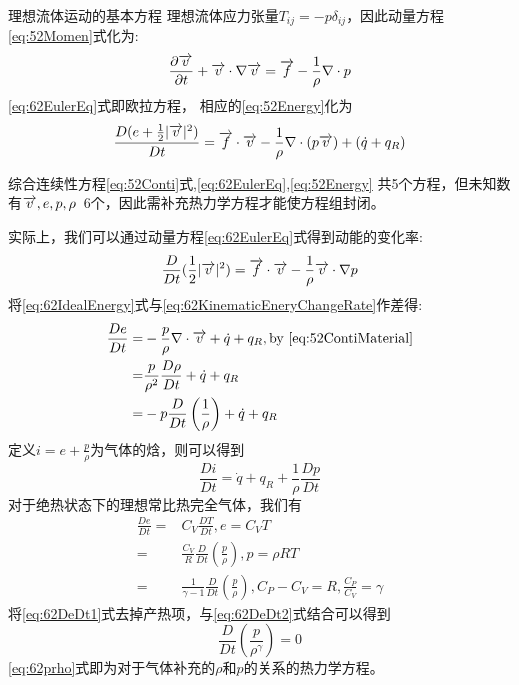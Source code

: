 
理想流体运动的基本方程
理想流体应力张量$T_{ij}=-p\delta_{ij}$，因此动量方程\eqref{eq:52Momen}式化为:
\begin{equation}\label{eq:62EulerEq}
 \frac{\partial \overrightarrow{v}}{\partial t}+\overrightarrow{v}\cdot\nabla\overrightarrow{v}=\overrightarrow{f}-\frac{1}{\rho}\nabla\cdot p
\end{equation}
\eqref{eq:62EulerEq}式即欧拉方程，
相应的\eqref{eq:52Energy}化为
\begin{equation}\label{eq:62IdealEnergy}
 \frac{D(e+\frac{1}{2}|\overrightarrow{v}|^2)}{Dt}=
 \overrightarrow{f}\cdot\overrightarrow{v}-\frac{1}{\rho}\nabla\cdot(p\overrightarrow{v})+(\dot{q}+q_R) 
\end{equation}

综合连续性方程\eqref{eq:52Conti}式,\eqref{eq:62EulerEq},\eqref{eq:52Energy}
共5个方程，但未知数有$\overrightarrow{v},e,p,\rho\,$ 6个，因此需补充热力学方程才能使方程组封闭。

实际上，我们可以通过动量方程\eqref{eq:62EulerEq}式得到动能的变化率:
\begin{equation}\label{eq:62KinematicEneryChangeRate}
\frac{D}{D t}(\frac{1}{2}|\overrightarrow{v}|^2)=\overrightarrow{f}\cdot \overrightarrow{v}-\frac{1}{\rho}\overrightarrow{v}\cdot\nabla p
\end{equation}
将\eqref{eq:62IdealEnergy}式与\eqref{eq:62KinematicEneryChangeRate}作差得:
\begin{align}
\frac{De}{Dt}= & -\frac{p}{\rho} \nabla \cdot \overrightarrow{v} + \dot{q}+q_R ,\text{by }\eqref{eq:52ContiMaterial}\nonumber\\
=& \frac{p}{\rho^2}\frac{D\rho}{Dt} + \dot{q}+q_R \nonumber\\
=& -p\frac{D}{Dt}\left(\frac{1}{\rho}\right) + \dot{q}+q_R\label{eq:62DeDt1}
\end{align}
定义$i=e+\frac{p}{\rho}$为气体的焓，则可以得到
\begin{equation}
\frac{D i}{D t}=\dot{q}+q_R + \frac{1}{\rho} \frac{D p }{D t}
\end{equation}
对于绝热状态下的理想常比热完全气体，我们有
\begin{align}
\frac{D e}{D t}=& C_V \frac{D T}{D t},e=C_V T\nonumber\\
=& \frac{C_V}{R} \frac{D}{D t}\left(\frac{p}{\rho}\right),p=\rho RT\nonumber\\
=& \frac{1}{\gamma -1} \frac{D}{D t}\left(\frac{p}{\rho}\right),C_P-C_V=R,\frac{C_P}{C_V}=\gamma \label{eq:62DeDt2}
\end{align}
将\eqref{eq:62DeDt1}式去掉产热项，与\eqref{eq:62DeDt2}式结合可以得到
\begin{equation}\label{eq:62prho}
\frac{D}{D t}\left(\frac{p}{\rho^{\gamma}}\right)=0
\end{equation}
\eqref{eq:62prho}式即为对于气体补充的$\rho$和$p$的关系的热力学方程。

